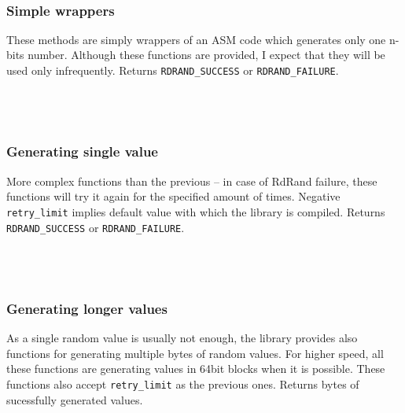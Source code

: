\\

\subsubsection{Simple wrappers}
These methods are simply wrappers of an ASM code which generates only one n-bits number. Although these functions are provided, I expect that they will be used only infrequently. Returns {\tt RDRAND\_SUCCESS} or {\tt RDRAND\_FAILURE}.\\

\\

\\

\\

\subsubsection{Generating single value}
More complex functions than the previous -- in case of RdRand failure, these functions will try it again for the specified amount of times. Negative {\tt retry\_limit} implies default value with which the library is compiled. Returns {\tt RDRAND\_SUCCESS} or {\tt RDRAND\_FAILURE}.\\


\\

\\

\\

\subsubsection{Generating longer values}
As a single random value is usually not enough, the library provides also functions for generating multiple bytes of random values. For higher speed, all these functions are generating values in 64bit blocks when it is possible.
These functions also accept {\tt retry\_limit} as the previous ones. Returns bytes of sucessfully generated values.\\


